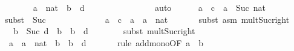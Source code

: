 \begin{isabellebody}
\ \ \ \ \isamarkupfalse%
\ {}{\isacharcolon}{\kern0pt}\ {\isachardoublequoteopen}a\ {\isacharasterisk}{\kern0pt}\ nat\ {\isasymle}\ b\ {\isacharasterisk}{\kern0pt}\ d{\isachardoublequoteclose}\isanewline
\ \ \ \ \ \ \isamarkupfalse%
\ {}\isanewline
\ \ \ \ \ \ \isamarkupfalse%
\ auto\isanewline
\ \ \ \ \isamarkupfalse%
\ {\isachardoublequoteopen}a\ {\isacharasterisk}{\kern0pt}\ c\ {\isacharequal}{\kern0pt}\ a\ {\isacharasterisk}{\kern0pt}\ {\isacharparenleft}{\kern0pt}Suc\ nat{\isacharparenright}{\kern0pt}{\isachardoublequoteclose}\isanewline
\ \ \ \ \ \ \isamarkupfalse%
{\isacharparenleft}{\kern0pt}subst\ \ Suc{\isacharparenright}{\kern0pt}\isanewline
\ \ \ \ \ \ \isacommand{{\isachardot}{\kern0pt}{\isachardot}{\kern0pt}}\isamarkupfalse%
\isanewline
\ \ \ \ \isamarkupfalse%
\ {}{\isacharcolon}{\kern0pt}\ {\isachardoublequoteopen}a\ {\isacharasterisk}{\kern0pt}\ c\ {\isacharequal}{\kern0pt}\ a\ {\isacharplus}{\kern0pt}\ a\ {\isacharasterisk}{\kern0pt}\ nat{\isachardoublequoteclose}\isanewline
\ \ \ \ \ \ \isamarkupfalse%
{\isacharparenleft}{\kern0pt}subst\ {\isacharparenleft}{\kern0pt}asm{\isacharparenright}{\kern0pt}\ mult{\isacharunderscore}{\kern0pt}Suc{\isacharunderscore}{\kern0pt}right{\isacharparenright}{\kern0pt}\isanewline
\isanewline
\ \ \ \ \isamarkupfalse%
\ {}{\isacharcolon}{\kern0pt}\ {\isachardoublequoteopen}b\ {\isacharasterisk}{\kern0pt}\ Suc\ d\ {\isacharequal}{\kern0pt}\ b\ {\isacharplus}{\kern0pt}\ b\ {\isacharasterisk}{\kern0pt}\ d{\isachardoublequoteclose}\isanewline
\ \ \ \ \ \ \isamarkupfalse%
\ {\isacharparenleft}{\kern0pt}subst\ mult{\isacharunderscore}{\kern0pt}Suc{\isacharunderscore}{\kern0pt}right{\isacharparenright}{\kern0pt}\isanewline
\ \ \ \ \ \ \isacommand{{\isachardot}{\kern0pt}{\isachardot}{\kern0pt}}\isamarkupfalse%
\isanewline
\ \ \ \ \isamarkupfalse%
\ {\isachardoublequoteopen}a\ {\isacharplus}{\kern0pt}\ a\ {\isacharasterisk}{\kern0pt}\ nat\ {\isasymle}\ b\ {\isacharplus}{\kern0pt}\ b\ {\isacharasterisk}{\kern0pt}\ d{\isachardoublequoteclose}\isanewline
\ \ \ \ \ \ \isamarkupfalse%
{\isacharparenleft}{\kern0pt}rule\ add{\isacharunderscore}{\kern0pt}mono{\isacharbrackleft}{\kern0pt}OF\ {\isacartoucheopen}a\ {\isasymle}\ b{\isacartoucheclose}\ {}{\isacharbrackright}{\kern0pt}{\isacharparenright}{\kern0pt}\isanewline
\ \ \ \ \isamarkupfalse%
\ \isamarkupfalse%

\end{isabellebody}
